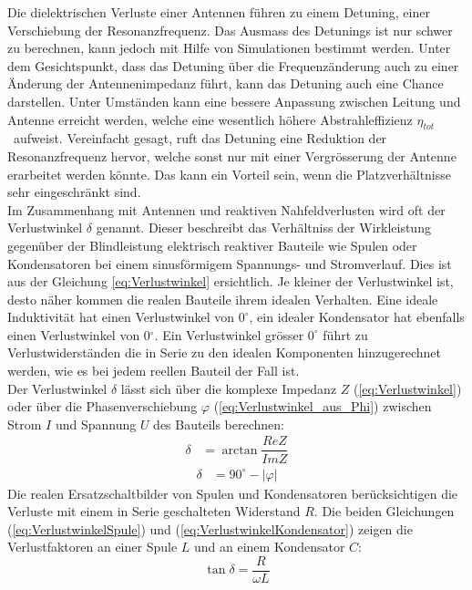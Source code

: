 Die dielektrischen Verluste einer Antennen führen zu einem Detuning, einer Verschiebung der Resonanzfrequenz. Das Ausmass des Detunings ist nur schwer zu berechnen, kann jedoch mit Hilfe von Simulationen bestimmt werden. Unter dem Gesichtspunkt, dass das Detuning über die Frequenzänderung auch zu einer Änderung der Antennenimpedanz führt, kann das Detuning auch eine Chance darstellen. Unter Umständen kann eine bessere Anpassung zwischen Leitung und Antenne erreicht werden, welche eine wesentlich höhere Abstrahleffizienz $\eta_{tot}$ \ aufweist. Vereinfacht gesagt, ruft das Detuning  eine Reduktion der Resonanzfrequenz hervor, welche sonst nur mit einer Vergrösserung der Antenne erarbeitet werden könnte. Das kann ein Vorteil sein, wenn die Platzverhältnisse sehr eingeschränkt sind.\\
Im Zusammenhang mit Antennen und reaktiven Nahfeldverlusten wird oft der Verlustwinkel $\delta$ genannt. Dieser beschreibt das Verhältniss der Wirkleistung gegenüber der Blindleistung elektrisch reaktiver Bauteile wie Spulen oder Kondensatoren bei einem sinusförmigem Spannungs- und Stromverlauf. Dies ist aus der Gleichung \ref{eq:Verlustwinkel} ersichtlich. Je kleiner der Verlustwinkel ist, desto näher kommen die realen Bauteile ihrem idealen Verhalten. Eine ideale Induktivität hat einen Verlustwinkel von $0^\circ$, ein idealer Kondensator hat ebenfalls einen Verlustwinkel von 0$^\circ$. Ein Verlustwinkel grösser $0^\circ$ führt zu Verlustwiderständen die in Serie zu den idealen Komponenten hinzugerechnet werden, wie es bei jedem reellen Bauteil der Fall ist.\\
Der Verlustwinkel $\delta$ lässt sich über die komplexe Impedanz $Z$ (\ref{eq:Verlustwinkel}) oder über die Phasenverschiebung $\varphi$ (\ref{eq:Verlustwinkel_aus_Phi}) zwischen Strom $I$ und Spannung $U$ des Bauteils berechnen: 
\begin{align}
\label{eq:Verlustwinkel}
\delta &= \arctan \dfrac{ReZ}{ImZ}
\end{align}
\begin{align}
\label{eq:Verlustwinkel_aus_Phi}
\delta &= 90^\circ - |\varphi|
\end{align}
Die realen Ersatzschaltbilder von Spulen und Kondensatoren berücksichtigen die Verluste mit einem in Serie geschalteten Widerstand $R$. Die beiden Gleichungen (\ref{eq:VerlustwinkelSpule}) und (\ref{eq:VerlustwinkelKondensator}) zeigen die Verlustfaktoren an einer Spule $L$ und an einem Kondensator $C$:
\begin{equation}\label{eq:VerlustwinkelSpule}
\tan \delta = \dfrac{R}{\omega L}
\end{equation}

